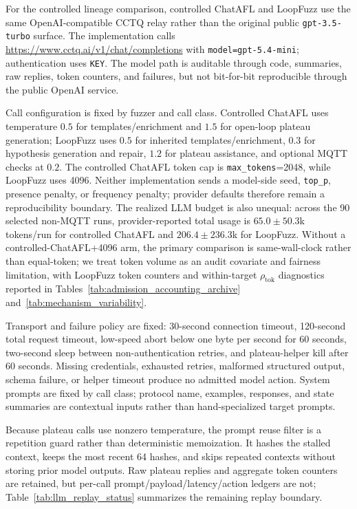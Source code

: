 \documentclass[final,5p,times,number]{elsarticle}
\begin{document}
For the controlled lineage comparison, controlled ChatAFL and LoopFuzz use the same OpenAI-compatible CCTQ relay rather than the original public \texttt{gpt-3.5-turbo} surface. The implementation calls \url{https://www.cctq.ai/v1/chat/completions} with \texttt{model=gpt-5.4-mini}; authentication uses \texttt{KEY}. The model path is auditable through code, summaries, raw replies, token counters, and failures, but not bit-for-bit reproducible through the public OpenAI service.

Call configuration is fixed by fuzzer and call class. Controlled ChatAFL uses temperature $0.5$ for templates/enrichment and $1.5$ for open-loop plateau generation; LoopFuzz uses $0.5$ for inherited templates/enrichment, $0.3$ for hypothesis generation and repair, $1.2$ for plateau assistance, and optional MQTT checks at $0.2$. The controlled ChatAFL token cap is \texttt{max\_tokens}=2048, while LoopFuzz uses 4096. Neither implementation sends a model-side seed, \texttt{top\_p}, presence penalty, or frequency penalty; provider defaults therefore remain a reproducibility boundary.
The realized LLM budget is also unequal: across the 90 selected non-MQTT runs, provider-reported total usage is $65.0{\pm}50.3$k tokens/run for controlled ChatAFL and $206.4{\pm}236.3$k for LoopFuzz. Without a controlled-ChatAFL+4096 arm, the primary comparison is same-wall-clock rather than equal-token; we treat token volume as an audit covariate and fairness limitation, with LoopFuzz token counters and within-target $\rho_{\mathrm{tok}}$ diagnostics reported in Tables~\ref{tab:admission_accounting_archive} and~\ref{tab:mechanism_variability}.

Transport and failure policy are fixed: 30-second connection timeout, 120-second total request timeout, low-speed abort below one byte per second for 60 seconds, two-second sleep between non-authentication retries, and plateau-helper kill after 60 seconds. Missing credentials, exhausted retries, malformed structured output, schema failure, or helper timeout produce no admitted model action. System prompts are fixed by call class; protocol name, examples, responses, and state summaries are contextual inputs rather than hand-specialized target prompts.

Because plateau calls use nonzero temperature, the prompt reuse filter is a repetition guard rather than deterministic memoization. It hashes the stalled context, keeps the most recent 64 hashes, and skips repeated contexts without storing prior model outputs. Raw plateau replies and aggregate token counters are retained, but per-call prompt/payload/latency/action ledgers are not; Table~\ref{tab:llm_replay_status} summarizes the remaining replay boundary.
\end{document}
